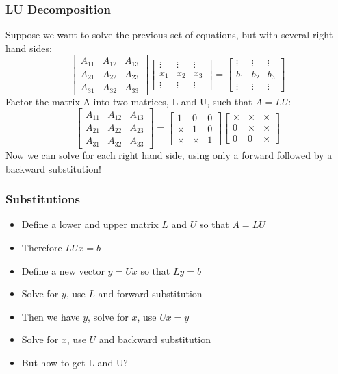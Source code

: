 \begin{frame}[fragile]
  \frametitle{LU Decomposition}
  Suppose we want to solve the previous set of equations, but with several right hand sides:
    \[ 
    \begin{bmatrix}
A_{11} & A_{12} & A_{13}\\ 
A_{21} & A_{22} & A_{23}\\ 
A_{31} & A_{32} & A_{33}
\end{bmatrix}
\begin{bmatrix}
\vdots & \vdots & \vdots \\
x_1 & x_2 & x_3 \\
\vdots & \vdots & \vdots
\end{bmatrix} = 
\begin{bmatrix}
\vdots & \vdots & \vdots \\
b_1 & b_2 & b_3 \\
\vdots & \vdots & \vdots
\end{bmatrix}
\]\pause
Factor the matrix A into two matrices, L and U, such that $A=LU$:
\[ 
    \begin{bmatrix}
A_{11} & A_{12} & A_{13}\\ 
A_{21} & A_{22} & A_{23}\\ 
A_{31} & A_{32} & A_{33}
\end{bmatrix} = 
\begin{bmatrix}
1 & 0 & 0 \\
\times & 1 & 0 \\
\times & \times & 1
\end{bmatrix}
\begin{bmatrix}
\times & \times & \times \\
0 & \times & \times \\
0 & 0 & \times
\end{bmatrix}
\]
Now we can solve for each right hand side, using only a forward
followed by a backward substitution!
\end{frame}

\begin{frame}[fragile]
  \frametitle{Substitutions}
  \begin{itemize}
    \item Define a lower and upper matrix $L$ and $U$ so that $A = LU$
    \item Therefore $LUx = b$
    \item Define a new vector $y = Ux$ so that $Ly = b$
    \item Solve for $y$, use $L$ and forward substitution
    \item Then we have $y$, solve for $x$, use $Ux = y$
    \item Solve for $x$, use $U$ and backward substitution
    \item But how to get L and U?
  \end{itemize}
\end{frame}

